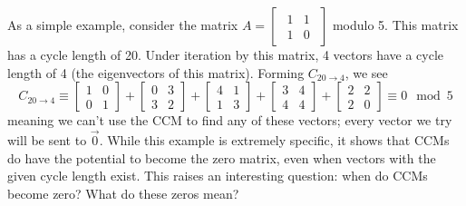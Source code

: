 \documentclass[a4paper, 12pt, reqno]{amsart}
\begin{document}
	As a simple example, consider the matrix $A = 
	\begin{bmatrix}
		\begin{smallmatrix}
			1 & 1 \\
			1 & 0
		\end{smallmatrix}
	\end{bmatrix}$ modulo 5. This matrix has a cycle length of 20. Under iteration by this matrix, 4 vectors have a cycle length of 4 (the eigenvectors of this matrix).
	Forming $C_{20 \rightarrow 4}$, we see
	\[
		C_{20 \rightarrow 4} \equiv 
		\begin{bmatrix}
			1 & 0 \\
			0 & 1
		\end{bmatrix} + 
		\begin{bmatrix}
			0 & 3 \\
			3 & 2
		\end{bmatrix} + 
		\begin{bmatrix}
			4 & 1 \\
			1 & 3
		\end{bmatrix} + 
		\begin{bmatrix}
			3 & 4 \\
			4 & 4
		\end{bmatrix} + 
		\begin{bmatrix}
			2 & 2 \\
			2 & 0
		\end{bmatrix} \equiv 0 \mod{5}
	\]
	meaning we can't use the CCM to find any of these vectors; every vector we try will be sent to $\vec{0}$. While this example is extremely specific, it shows that CCMs 
	do have the potential to become the zero matrix, even when vectors with the given cycle length exist. This raises an interesting question: when do CCMs become zero?
	What do these zeros mean? 
	
\end{document}
